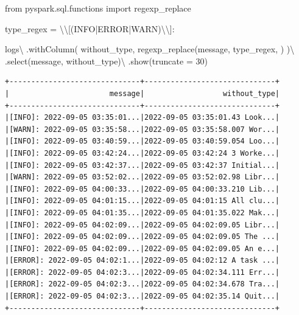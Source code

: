 \documentclass[
  11pt,
  letterpaper,
  DIV=11,
  numbers=noendperiod]{scrreprt}
\newenvironment{Shaded}{\begin{snugshade}}{\end{snugshade}}
\newcommand{\CharTok}[1]{\textcolor[rgb]{0.13,0.47,0.30}{#1}}
\newcommand{\DecValTok}[1]{\textcolor[rgb]{0.68,0.00,0.00}{#1}}
\newcommand{\ImportTok}[1]{\textcolor[rgb]{0.00,0.46,0.62}{#1}}
\newcommand{\NormalTok}[1]{\textcolor[rgb]{0.00,0.23,0.31}{#1}}
\newcommand{\OperatorTok}[1]{\textcolor[rgb]{0.37,0.37,0.37}{#1}}
\newcommand{\StringTok}[1]{\textcolor[rgb]{0.13,0.47,0.30}{#1}}
\begin{document}
\begin{Shaded}
\begin{Highlighting}[]
\ImportTok{from}\NormalTok{ pyspark.sql.functions }\ImportTok{import}\NormalTok{ regexp\_replace}

\NormalTok{type\_regex }\OperatorTok{=} \StringTok{\textquotesingle{}}\CharTok{\textbackslash{}\textbackslash{}}\StringTok{[(INFO|ERROR|WARN)}\CharTok{\textbackslash{}\textbackslash{}}\StringTok{]: \textquotesingle{}}

\NormalTok{logs}\OperatorTok{\textbackslash{}}
\NormalTok{    .withColumn(}
        \StringTok{\textquotesingle{}without\_type\textquotesingle{}}\NormalTok{,}
\NormalTok{        regexp\_replace(}\StringTok{\textquotesingle{}message\textquotesingle{}}\NormalTok{, type\_regex, }\StringTok{\textquotesingle{}\textquotesingle{}}\NormalTok{)}
\NormalTok{    )}\OperatorTok{\textbackslash{}}
\NormalTok{    .select(}\StringTok{\textquotesingle{}message\textquotesingle{}}\NormalTok{, }\StringTok{\textquotesingle{}without\_type\textquotesingle{}}\NormalTok{)}\OperatorTok{\textbackslash{}}
\NormalTok{    .show(truncate }\OperatorTok{=} \DecValTok{30}\NormalTok{)}
\end{Highlighting}
\end{Shaded}

\begin{verbatim}
+------------------------------+------------------------------+
|                       message|                  without_type|
+------------------------------+------------------------------+
|[INFO]: 2022-09-05 03:35:01...|2022-09-05 03:35:01.43 Look...|
|[WARN]: 2022-09-05 03:35:58...|2022-09-05 03:35:58.007 Wor...|
|[INFO]: 2022-09-05 03:40:59...|2022-09-05 03:40:59.054 Loo...|
|[INFO]: 2022-09-05 03:42:24...|2022-09-05 03:42:24 3 Worke...|
|[INFO]: 2022-09-05 03:42:37...|2022-09-05 03:42:37 Initial...|
|[WARN]: 2022-09-05 03:52:02...|2022-09-05 03:52:02.98 Libr...|
|[INFO]: 2022-09-05 04:00:33...|2022-09-05 04:00:33.210 Lib...|
|[INFO]: 2022-09-05 04:01:15...|2022-09-05 04:01:15 All clu...|
|[INFO]: 2022-09-05 04:01:35...|2022-09-05 04:01:35.022 Mak...|
|[INFO]: 2022-09-05 04:02:09...|2022-09-05 04:02:09.05 Libr...|
|[INFO]: 2022-09-05 04:02:09...|2022-09-05 04:02:09.05 The ...|
|[INFO]: 2022-09-05 04:02:09...|2022-09-05 04:02:09.05 An e...|
|[ERROR]: 2022-09-05 04:02:1...|2022-09-05 04:02:12 A task ...|
|[ERROR]: 2022-09-05 04:02:3...|2022-09-05 04:02:34.111 Err...|
|[ERROR]: 2022-09-05 04:02:3...|2022-09-05 04:02:34.678 Tra...|
|[ERROR]: 2022-09-05 04:02:3...|2022-09-05 04:02:35.14 Quit...|
+------------------------------+------------------------------+
\end{verbatim}
\end{document}
